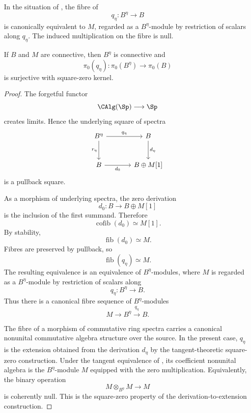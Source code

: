 \begin{proposition}
\label{prop:fibre-structured-square-zero}
In the situation of , the
fibre of
\[
    q_\eta
    \colon
    B^\eta
    \longrightarrow
    B
\]
is canonically equivalent to \(M\), regarded as a
\(B^\eta\)-module by restriction of scalars along \(q_\eta\). The induced
multiplication on the fibre is null.

If \(B\) and \(M\) are connective, then \(B^\eta\) is connective and
\[
    \pi_0(q_\eta)
    \colon
    \pi_0(B^\eta)
    \longrightarrow
    \pi_0(B)
\]
is surjective with square-zero kernel.
\end{proposition}
\begin{proof}
The forgetful functor
\[
    \CAlg(\Sp)
    \longrightarrow
    \Sp
\]
creates limits. Hence the underlying square of spectra
\[
\begin{tikzcd}[column sep=large, row sep=large]
    B^\eta
        \arrow[r, "q_\eta"]
        \arrow[d, "r_\eta"']
    &
    B
        \arrow[d, "d_\eta"]
    \\
    B
        \arrow[r, "d_0"']
    &
    B\oplus M[1]
\end{tikzcd}
\]
is a pullback square.

As a morphism of underlying spectra, the zero derivation
\[
    d_0
    \colon
    B
    \longrightarrow
    B\oplus M[1]
\]
is the inclusion of the first summand. Therefore
\[
    \operatorname{cofib}(d_0)
    \simeq
    M[1].
\]
By stability,
\[
    \operatorname{fib}(d_0)
    \simeq
    M.
\]
Fibres are preserved by pullback, so
\[
    \operatorname{fib}(q_\eta)
    \simeq
    M.
\]
The resulting equivalence is an equivalence of
\(B^\eta\)-modules, where \(M\) is regarded as a
\(B^\eta\)-module by restriction of scalars along
\[
    q_\eta
    \colon
    B^\eta
    \longrightarrow
    B.
\]
Thus there is a canonical fibre sequence of
\(B^\eta\)-modules
\[
    M
    \longrightarrow
    B^\eta
    \xrightarrow{q_\eta}
    B.
\]

The fibre of a morphism of commutative ring spectra carries a canonical
nonunital commutative algebra structure over the source. In the present
case, \(q_\eta\) is the extension obtained from the derivation
\(d_\eta\) by the tangent-theoretic square-zero construction. Under the
tangent equivalence of
, its coefficient nonunital algebra is
the \(B^\eta\)-module \(M\) equipped with the zero multiplication.
Equivalently, the binary operation
\[
    M\otimes_{B^\eta}M
    \longrightarrow
    M
\]
is coherently null. This is the square-zero property of the
derivation-to-extension construction.


\end{proof}
